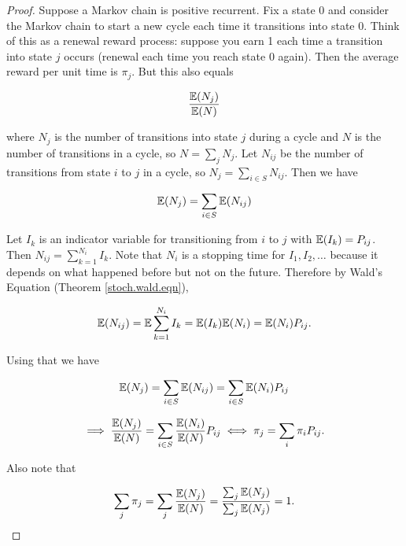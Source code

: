 \begin{proof}Suppose a Markov chain is positive recurrent. Fix a state 0 and consider the Markov chain to start a new cycle each time it transitions into state 0. Think of this as a renewal reward process: suppose you earn 1 each time a transition into state \(j\) occurs (renewal each time you reach state 0 again). Then the average reward per unit time is \(\pi_j\). But this also equals

\[
\frac{\E(N_j)}{\E(N)}
\]

where \(N_j\) is the number of transitions into state \(j\) during a cycle and \(N\) is the number of transitions in a cycle, so \(N = \sum_j N_j\). Let \(N_{ij}\) be the number of transitions from state \(i\) to \(j\) in a cycle, so \(N_j = \sum_{i \in S} N_{ij}\). Then we have

\[
\E(N_j) = \sum_{i \in S} \E(N_{ij}) 
\]

%
%
%
%

Let \(I_k\) is an indicator variable for transitioning from \(i\) to \(j\) with \(\E(I_k) = P_{ij}\). Then \(N_{ij} = \sum_{k=1}^{N_i} I_k\). Note that \(N_i\) is a stopping time for \(I_1, I_2, \ldots\) because it depends on what happened before but not on the future. Therefore by Wald's Equation (Theorem \ref{stoch.wald.eqn}),

\[
\E(N_{ij}) = \E \sum_{k=1}^{N_i} I_k = \E(I_k) \E(N_i) = \E(N_i)P_{ij}.
\]

 Using that we have

\[
\E(N_j) = \sum_{i \in S} \E(N_{ij}) =  \sum_{i \in S} \E(N_i)P_{ij}
\]

\[
\implies \frac{\E(N_j) }{\E(N)} =  \sum_{i \in S} \frac{\E(N_i)}{\E(N)} P_{ij} \iff \pi_j = \sum_i \pi_i P_{ij}.
\]

Also note that

\[
\sum_j \pi_j = \sum_j \frac{\E(N_j)}{\E(N)} =  \frac{\sum_j \E(N_j)}{\sum_j \E(N_j)} = 1.
\]

\end{proof}

